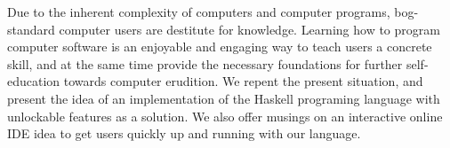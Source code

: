 Due to the inherent complexity of computers and computer programs, 
bog-standard computer users are destitute for knowledge. Learning how to 
program computer software is an enjoyable and engaging way to teach users a 
concrete skill, and at the same time provide the necessary foundations for 
further self-education towards computer erudition. We repent the present 
situation, and present the idea of an implementation of the Haskell programing 
language with unlockable features as a solution. We also offer musings on an 
interactive online IDE idea to get users quickly up and running with our 
language.
